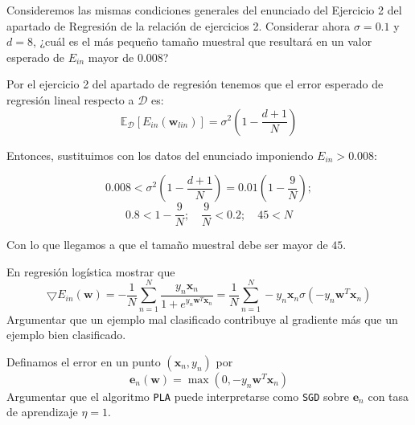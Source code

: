 \documentclass[11pt,leqno]{article}
\theoremstyle{definition}
\begin{document}
\begin{cuestion}
Consideremos las mismas condiciones generales del enunciado del Ejercicio 2 del apartado de Regresión de la relación de ejercicios 2. Considerar ahora $\sigma = 0.1$ y $d = 8$, ¿cuál es el más pequeño tamaño muestral que resultará en un valor esperado de $E_{in}$ mayor de $0.008$?
\end{cuestion}

\begin{solucion}
Por el ejercicio 2 del apartado de regresión tenemos que el error esperado de regresión lineal respecto a $\mathcal{D}$ es:
\[ \mathbb{E}_\mathcal{D}[ E_{in}(\mathbf{w}_{lin})] =
		\sigma^2 \left( 1 - \frac{d+1}{N} \right) \]
		
Entonces, sustituimos con los datos del enunciado imponiendo $E_{in} > 0.008$:

\[ 0.008 < \sigma^2 \left( 1 - \frac{d+1}{N} \right) =
			0.01 \left( 1 - \frac{9}{N} \right); \]
\[ 0.8 < 1 - \frac{9}{N};\quad \frac{9}{N} < 0.2;\quad 45 < N 	\]

Con lo que llegamos a que el tamaño muestral debe ser mayor de $45$.

\end{solucion}


\begin{cuestion}
En regresión logística mostrar que
\[ \bigtriangledown E_{in}(\mathbf{w})=
		-\frac{1}{N} 
		\sum\limits_{n=1}^N \frac{y_n \mathbf{x}_n}
				{1+e^{y_n \mathbf{w}^T\mathbf{x}_n}} = 
		\frac{1}{N}
		\sum\limits_{n=1}^N - y_n\mathbf{x}_n
					\sigma(-y_n\mathbf{w}^T\mathbf{x}_n) \]
Argumentar que un ejemplo mal clasificado contribuye al gradiente más que un ejemplo bien clasificado.
\end{cuestion}

\begin{solucion}
\end{solucion}

\begin{cuestion}
Definamos el error en un punto $(\mathbf{x}_n,y_n)$ por
\[ \mathbf{e}_n(\mathbf{w}) = \max(0, -y_n\mathbf{w}^T\mathbf{x}_n)	\]
Argumentar que el algoritmo \texttt{PLA} puede interpretarse como \texttt{SGD} sobre $\mathbf{e}_n$ con tasa de aprendizaje $\eta = 1$.
\end{cuestion}

\begin{solucion}
\end{solucion}
\end{document}
